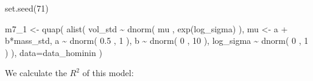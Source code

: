 \documentclass[
]{book}
\newenvironment{Shaded}{\begin{snugshade}}{\end{snugshade}}
\newcommand{\AttributeTok}[1]{\textcolor[rgb]{0.77,0.63,0.00}{#1}}
\newcommand{\DecValTok}[1]{\textcolor[rgb]{0.00,0.00,0.81}{#1}}
\newcommand{\FloatTok}[1]{\textcolor[rgb]{0.00,0.00,0.81}{#1}}
\newcommand{\FunctionTok}[1]{\textcolor[rgb]{0.00,0.00,0.00}{#1}}
\newcommand{\NormalTok}[1]{#1}
\newcommand{\OtherTok}[1]{\textcolor[rgb]{0.56,0.35,0.01}{#1}}
\newcommand{\SpecialCharTok}[1]{\textcolor[rgb]{0.00,0.00,0.00}{#1}}
\begin{document}
\begin{Shaded}
\begin{Highlighting}[]
\FunctionTok{set.seed}\NormalTok{(}\DecValTok{71}\NormalTok{)}

\NormalTok{m7\_1 }\OtherTok{\textless{}{-}} \FunctionTok{quap}\NormalTok{( }\FunctionTok{alist}\NormalTok{(}
\NormalTok{  vol\_std }\SpecialCharTok{\textasciitilde{}} \FunctionTok{dnorm}\NormalTok{( mu , }\FunctionTok{exp}\NormalTok{(log\_sigma) ), }
\NormalTok{  mu }\OtherTok{\textless{}{-}}\NormalTok{ a }\SpecialCharTok{+}\NormalTok{ b}\SpecialCharTok{*}\NormalTok{mass\_std, }
\NormalTok{  a }\SpecialCharTok{\textasciitilde{}} \FunctionTok{dnorm}\NormalTok{( }\FloatTok{0.5}\NormalTok{ , }\DecValTok{1}\NormalTok{ ), }
\NormalTok{  b }\SpecialCharTok{\textasciitilde{}} \FunctionTok{dnorm}\NormalTok{( }\DecValTok{0}\NormalTok{ , }\DecValTok{10}\NormalTok{ ), }
\NormalTok{  log\_sigma }\SpecialCharTok{\textasciitilde{}} \FunctionTok{dnorm}\NormalTok{( }\DecValTok{0}\NormalTok{ , }\DecValTok{1}\NormalTok{ )}
\NormalTok{), }\AttributeTok{data=}\NormalTok{data\_hominin )}
\end{Highlighting}
\end{Shaded}

We calculate the \(R^2\) of this model:
\end{document}
